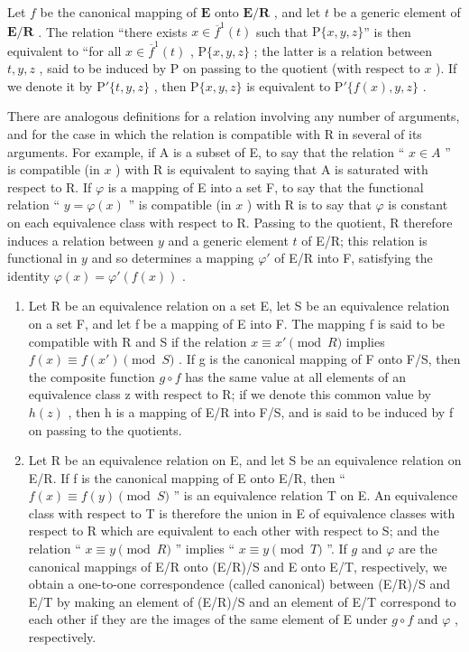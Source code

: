 Let \(f\) be the canonical mapping of \(\mathbf{E}\) onto \(\mathbf{E} / \mathbf{R}\) , and let \(t\) be a generic element of \(\mathbf{E} / \mathbf{R}\) . The relation ``there exists \(x \in \overline{f}^1(t)\) such that \(\mathrm{P}\{x, y, z\}\)'' is then equivalent to ``for all \(x \in \overline{f}^1(t)\) , \(\mathrm{P}\{x, y, z\}\) ; the latter is a relation between \(t, y, z\) , said to be induced by \(\mathrm{P}\) on passing to the quotient (with respect to \(x\) ). If we denote it by \(\mathrm{P}'\{t, y, z\}\) , then \(\mathrm{P}\{x, y, z\}\) is equivalent to \(\mathrm{P}'\{f(x), y, z\}\) .

There are analogous definitions for a relation involving any number of arguments, and for the case in which the relation is compatible with R in several of its arguments. For example, if A is a subset of E, to say that the relation `` \(x \in A\) '' is compatible (in \(x\) ) with R is equivalent to saying that A is saturated with respect to R. If \(\varphi\) is a mapping of E into a set F, to say that the functional relation `` \(y = \varphi(x)\) '' is compatible (in \(x\) ) with R is to say that \(\varphi\) is constant on each equivalence class with respect to R. Passing to the quotient, R therefore induces a relation between \(y\) and a generic element \(t\) of E/R; this relation is functional in \(y\) and so determines a mapping \(\varphi'\) of E/R into F, satisfying the identity \(\varphi(x) = \varphi'(f(x))\) .

\begin{enumerate}
\def\labelenumi{\arabic{enumi}.}
\setcounter{enumi}{7}
\item
  Let R be an equivalence relation on a set E, let S be an equivalence relation on a set F, and let f be a mapping of E into F. The mapping f is said to be compatible with R and S if the relation \(x \equiv x' \pmod{R}\) implies \(f(x) \equiv f(x') \pmod{S}\) . If g is the canonical mapping of F onto F/S, then the composite function \(g \circ f\) has the same value at all elements of an equivalence class z with respect to R; if we denote this common value by \(h(z)\) , then h is a mapping of E/R into F/S, and is said to be induced by f on passing to the quotients.
\item
  Let R be an equivalence relation on E, and let S be an equivalence relation on E/R. If f is the canonical mapping of E onto E/R, then `` \(f(x) \equiv f(y) \pmod{S}\) '' is an equivalence relation T on E. An equivalence class with respect to T is therefore the union in E of equivalence classes with respect to R which are equivalent to each other with respect to S; and the relation `` \(x \equiv y \pmod{R}\) '' implies `` \(x \equiv y \pmod{T}\) ''. If \(g\) and \(\varphi\) are the canonical mappings of E/R onto (E/R)/S and E onto E/T, respectively, we obtain a one-to-one correspondence (called canonical) between (E/R)/S and E/T by making an element of (E/R)/S and an element of E/T correspond to each other if they are the images of the same element of E under \(g \circ f\) and \(\varphi\) , respectively.
\end{enumerate}

